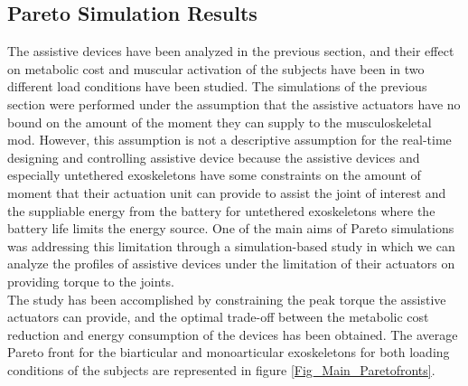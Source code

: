 \documentclass[10pt,letterpaper]{article}
\begin{document}
\subsection*{Pareto Simulation Results}
The assistive devices have been analyzed in the previous section, and their effect on metabolic cost and muscular activation of the subjects have been in two different load conditions have been studied. The simulations of the previous section were performed under the assumption that the assistive actuators have no bound on the amount of the moment they can supply to the musculoskeletal mod. However, this assumption is not a descriptive assumption for the real-time designing and controlling assistive device because the assistive devices and especially untethered exoskeletons have some constraints on the amount of moment that their actuation unit can provide to assist the joint of interest and the suppliable energy from the battery for untethered exoskeletons where the battery life limits the energy source. 
One of the main aims of Pareto simulations was addressing this limitation through a simulation-based study in which we can analyze the profiles of assistive devices under the limitation of their actuators on providing torque to the joints. \\
The study has been accomplished by constraining the peak torque the assistive actuators can provide, and the optimal trade-off between the metabolic cost reduction and energy consumption of the devices has been obtained. The average Pareto front for the biarticular and monoarticular exoskeletons for both loading conditions of the subjects are represented in figure \ref{Fig_Main_Paretofronts}.\\
\end{document}

